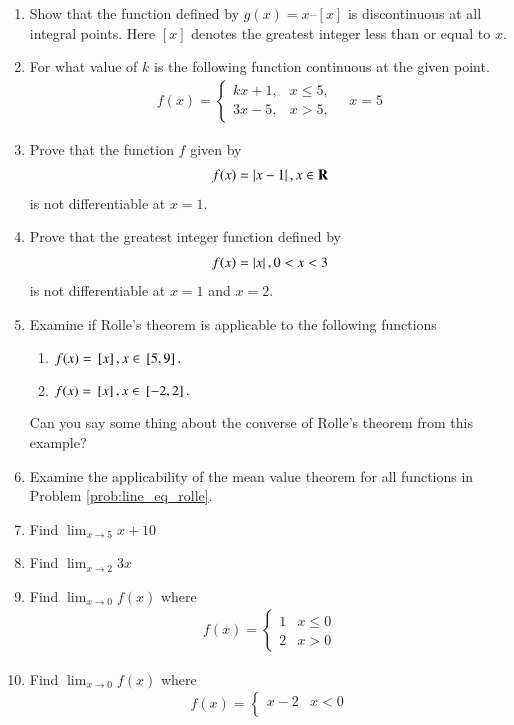 \begin{enumerate}[label=\arabic*.,ref=\thesubsection.\theenumi]
\item Show that the function defined by $g (x) = x – [x]$ is discontinuous at all integral points. Here $[x]$ denotes the greatest integer less than or equal to $x$.
\item For what value of $k$ is the following function 
%
continuous at the given point.
\begin{align}
f(x)=
\begin{cases}
kx+1, & x \le 5,
\\
3x-5, & x > 5,
\end{cases}
\quad x = 5
\end{align}
\item Prove that the function $f$ given by 
\begin{align}
f(x) = \left\vert x-1\right\vert, x \in \mathbf{R}
\end{align}
%
is not differentiable at $x = 1$.
\item Prove that the greatest integer function defined by 
\begin{align}
f(x) = \left\vert x\right\vert, 0 < x < 3
\end{align}
%
is not differentiable at $x = 1$ and $x = 2$.
\item Examine if Rolle's theorem is applicable to the following functions
\begin{enumerate}
\item 
\label{prob:line_eq_rolle}
$
f(x) = {}\left[x\right], x \in {}\left[5,9\right].
$
\item 
$
f(x) = {}\left[x\right], x \in {}\left[-2,2\right].
$
\end{enumerate}
Can you say some thing about the converse of Rolle's theorem from this example?
\item  Examine the applicability of the mean value theorem for all functions in Problem \ref{prob:line_eq_rolle}.
%
\item Find $\lim_{x\to 5} x+10$
\item Find $\lim_{x\to 2} 3x$
\item Find $\lim_{x\to 0}f(x)$ where
%
\begin{align}
f(x)  = 
\begin{cases}
1 & x \le 0
\\
2 & x > 0
\end{cases}
\end{align}
\item Find $\lim_{x\to 0}f(x)$ where
%
\begin{align}
f(x)  = 
\begin{cases}
x-2 & x < 0
\\

\end{cases}
\end{align}
\end{enumerate}
